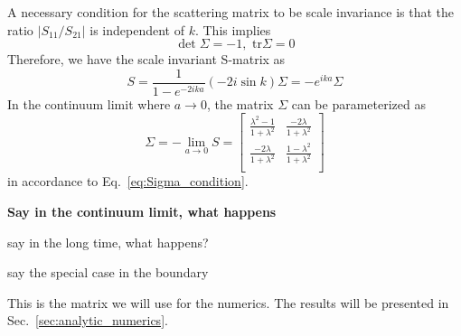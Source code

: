 A necessary condition for the scattering matrix to be scale invariance is that the ratio $|S_{11}/S_{21}|$ is independent of $k$. This implies 
\begin{equation}
\label{eq:Sigma_condition}
\det \Sigma = -1, \, \, \text{tr} \Sigma = 0
\end{equation}
Therefore, we have the scale invariant S-matrix as
\begin{equation}
S = \frac{1}{1 - e^{-2ika } } ( -2i \sin k ) \Sigma
 = - e^{ika} \Sigma
\end{equation}
In the continuum limit where $a\rightarrow0$, the matrix $\Sigma$ can be parameterized as
\begin{equation}
\Sigma = -\lim_{a \rightarrow 0 } S = 
\begin{bmatrix}
\frac{\lambda^2- 1}{1 + \lambda^2} & \frac{-2\lambda }{1 + \lambda^2} \\
\frac{-2\lambda }{1 + \lambda^2} & \frac{1- \lambda^2}{1 + \lambda^2} \\
\end{bmatrix}
\end{equation}
in accordance to Eq.~\eqref{eq:Sigma_condition}. 

{\bf\color{red}
Say in the continuum limit, what happens

say in the long time, what happens? 

say the special case in the boundary
}

This is the matrix we will use for the numerics. The results will be presented in Sec.~\ref{sec:analytic_numerics}.


